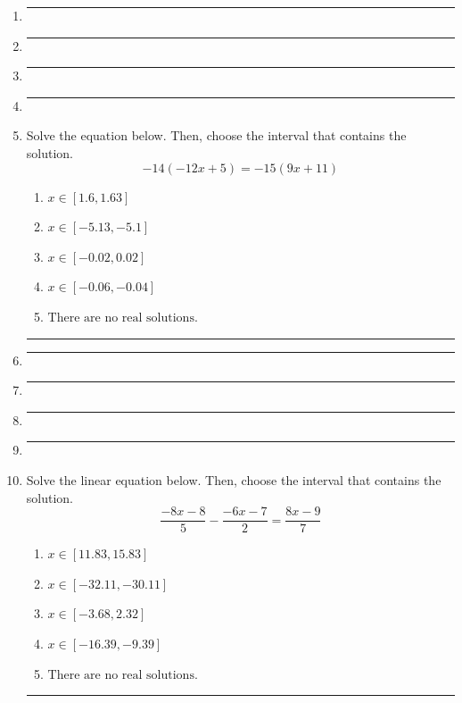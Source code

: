 \documentclass[14pt]{extbook}
\newcommand{\litem}[1]{\item#1\hspace*{-1cm}\rule{\textwidth}{0.4pt}}
\begin{document}
\begin{enumerate}
{\begin{enumerate}[label=\Alph*.]
\end{enumerate} }
\litem{
\begin{enumerate}[label=\Alph*.]

\end{enumerate} }
\litem{
\begin{enumerate}[label=\Alph*.]

\end{enumerate} }
\litem{
\begin{enumerate}[label=\Alph*.]

\end{enumerate} }
\litem{
\begin{enumerate}[label=\Alph*.]

\end{enumerate} }
\litem{
Solve the equation below. Then, choose the interval that contains the solution.\[ -14(-12x + 5) = -15(9x + 11) \]\begin{enumerate}[label=\Alph*.]
\item \( x \in [1.6, 1.63] \)
\item \( x \in [-5.13, -5.1] \)
\item \( x \in [-0.02, 0.02] \)
\item \( x \in [-0.06, -0.04] \)
\item \( \text{There are no real solutions.} \)

\end{enumerate} }
\litem{
\begin{enumerate}[label=\Alph*.]

\end{enumerate} }
\litem{
\begin{enumerate}[label=\Alph*.]

\end{enumerate} }
\litem{
\begin{enumerate}[label=\Alph*.]

\end{enumerate} }
\litem{
\begin{enumerate}[label=\Alph*.]

\end{enumerate} }
\litem{
Solve the linear equation below. Then, choose the interval that contains the solution.\[ \frac{-8x -8}{5} - \frac{-6x -7}{2} = \frac{8x -9}{7} \]\begin{enumerate}[label=\Alph*.]
\item \( x \in [11.83, 15.83] \)
\item \( x \in [-32.11, -30.11] \)
\item \( x \in [-3.68, 2.32] \)
\item \( x \in [-16.39, -9.39] \)
\item \( \text{There are no real solutions.} \)

\end{enumerate} }
\end{enumerate}
\end{document}

